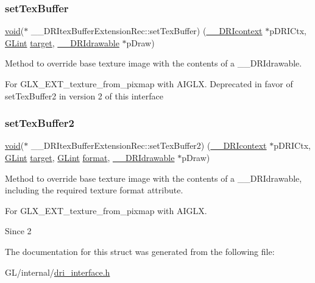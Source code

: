 \subsubsection{\texorpdfstring{set\+Tex\+Buffer}{setTexBuffer}}
{\footnotesize\ttfamily \hyperlink{_s_d_l__opengles2__gl2ext_8h_ae5d8fa23ad07c48bb609509eae494c95}{void}($\ast$ \+\_\+\+\_\+\+D\+R\+Itex\+Buffer\+Extension\+Rec\+::set\+Tex\+Buffer) (\hyperlink{dri__interface_8h_a3fd295cba82b5a3d79f1ee7e12bfb908}{\+\_\+\+\_\+\+D\+R\+Icontext} $\ast$p\+D\+R\+I\+Ctx, \hyperlink{gl_8h_acebcc1c5663f14ebde1d16831e5fed94}{G\+Lint} \hyperlink{glcorearb_8h_af9d0cbbbeb7414e786c41899e5a856d7}{target}, \hyperlink{dri__interface_8h_a5bfb832a0a08208d95b3bbef439d2262}{\+\_\+\+\_\+\+D\+R\+Idrawable} $\ast$p\+Draw)}

Method to override base texture image with the contents of a \+\_\+\+\_\+\+D\+R\+Idrawable.

For G\+L\+X\+\_\+\+E\+X\+T\+\_\+texture\+\_\+from\+\_\+pixmap with A\+I\+G\+LX. Deprecated in favor of set\+Tex\+Buffer2 in version 2 of this interface \mbox{\label{struct_____d_r_itex_buffer_extension_rec_ab30d162fbd2ae10cc2597d393028cc18}} 
\subsubsection{\texorpdfstring{set\+Tex\+Buffer2}{setTexBuffer2}}
{\footnotesize\ttfamily \hyperlink{_s_d_l__opengles2__gl2ext_8h_ae5d8fa23ad07c48bb609509eae494c95}{void}($\ast$ \+\_\+\+\_\+\+D\+R\+Itex\+Buffer\+Extension\+Rec\+::set\+Tex\+Buffer2) (\hyperlink{dri__interface_8h_a3fd295cba82b5a3d79f1ee7e12bfb908}{\+\_\+\+\_\+\+D\+R\+Icontext} $\ast$p\+D\+R\+I\+Ctx, \hyperlink{gl_8h_acebcc1c5663f14ebde1d16831e5fed94}{G\+Lint} \hyperlink{glcorearb_8h_af9d0cbbbeb7414e786c41899e5a856d7}{target}, \hyperlink{gl_8h_acebcc1c5663f14ebde1d16831e5fed94}{G\+Lint} \hyperlink{gl_8h_a71a65ffd977afe9c3fef116a5bc9ee27}{format}, \hyperlink{dri__interface_8h_a5bfb832a0a08208d95b3bbef439d2262}{\+\_\+\+\_\+\+D\+R\+Idrawable} $\ast$p\+Draw)}

Method to override base texture image with the contents of a \+\_\+\+\_\+\+D\+R\+Idrawable, including the required texture format attribute.

For G\+L\+X\+\_\+\+E\+X\+T\+\_\+texture\+\_\+from\+\_\+pixmap with A\+I\+G\+LX.

\begin{DoxySince}{Since}
2 
\end{DoxySince}


The documentation for this struct was generated from the following file\+:\begin{DoxyCompactItemize}
\item 
G\+L/internal/\hyperlink{dri__interface_8h}{dri\+\_\+interface.\+h}\end{DoxyCompactItemize}
